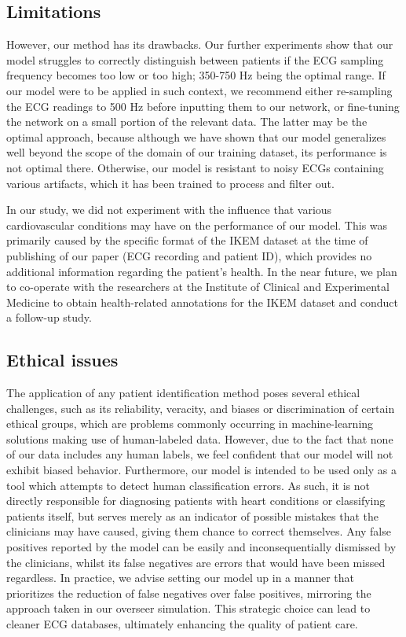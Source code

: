 \documentclass[preprint,12pt]{elsarticle}
\begin{document}
\subsection{Limitations}
However, our method has its drawbacks. Our further experiments show that our model struggles to correctly distinguish between patients if the ECG sampling frequency becomes too low or too high; 350-750 Hz being the optimal range. If our model were to be applied in such context, we recommend either re-sampling the ECG readings to 500 Hz before inputting them to our network, or fine-tuning the network on a small portion of the relevant data. The latter may be the optimal approach, because although we have shown that our model generalizes well beyond the scope of the domain of our training dataset, its performance is not optimal there. Otherwise, our model is resistant to noisy ECGs containing various artifacts, which it has been trained to process and filter out.

In our study, we did not experiment with the influence that various cardiovascular conditions may have on the performance of our model. This was primarily caused by the specific format of the IKEM dataset at the time of publishing of our paper (ECG recording and patient ID), which provides no additional information regarding the patient's health. In the near future, we plan to co-operate with the researchers at the Institute of Clinical and Experimental Medicine to obtain health-related annotations for the IKEM dataset and conduct a follow-up study.

\subsection{Ethical issues}
The application of any patient identification method poses several ethical challenges, such as its reliability, veracity, and biases or discrimination of certain ethical groups, which are problems commonly occurring in machine-learning solutions making use of human-labeled data. However, due to the fact that none of our data includes any human labels, we feel confident that our model will not exhibit biased behavior. Furthermore, our model is intended to be used only as a tool which attempts to detect human classification errors. As such, it is not directly responsible for diagnosing patients with heart conditions or classifying patients itself, but serves merely as an indicator of possible mistakes that the clinicians may have caused, giving them chance to correct themselves. Any false positives reported by the model can be easily and inconsequentially dismissed by the clinicians, whilst its false negatives are errors that would have been missed regardless. In practice, we advise setting our model up in a manner that prioritizes the reduction of false negatives over false positives, mirroring the approach taken in our overseer simulation. This strategic choice can lead to cleaner ECG databases, ultimately enhancing the quality of patient care.
\end{document}
